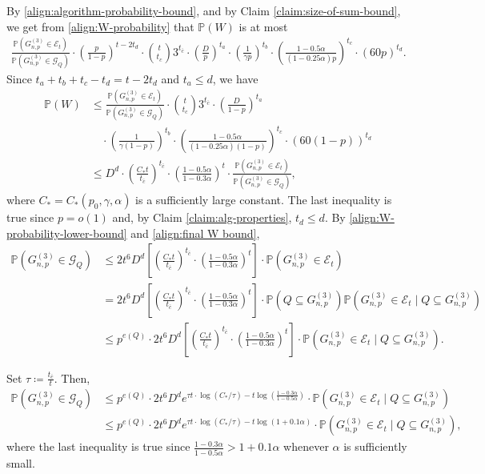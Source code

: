 \documentclass[11pt,a4paper,oneside,reqno]{amsart}
\newcommand{\Gnp}{G_{n, p}^{(3)}}
\newcommand{\cE}{\mathcal{E}}
\newcommand{\cG}{\mathcal{G}}
\renewcommand{\Pr}{\mathbb{P}}
\newcommand{\1}{\mathbbm{1}} %
\renewcommand{\le}{\leqslant}
\begin{document}
By \eqref{align:algorithm-probability-bound}, and by Claim \ref{claim:size-of-sum-bound}, we get from \eqref{align:W-probability} that $\Pr(W)$ is at most
\begin{align*}    
    \frac{\Pr\left(\Gnp \in \cE_t\right)}{\Pr\left(\Gnp \in \cG_Q\right)} \cdot \left(\frac{p}{1-p}\right)^{t - 2t_d} \cdot \binom{t}{t_c} 3^{t_{\bar{c}}} \cdot \left(\frac{D}{p}\right)^{t_a} \cdot \left(\frac{1}{\gamma p}\right)^{t_b} \cdot \left(\frac{1-0.5\alpha}{(1-0.25\alpha)p}\right)^{t_c} \cdot (60p)^{t_d}.
\end{align*}
Since $t_a + t_b + t_c - t_d = t - 2t_d$ and $t_a \le d$, we have
\begin{align}\label{align:final W bound}
    \nonumber\Pr(W) &\le \frac{\Pr\left(\Gnp \in \cE_t\right)}{\Pr\left(\Gnp \in \cG_Q\right)} \cdot \binom{t}{t_c} 3^{t_{\bar{c}}} \cdot \left(\frac{D}{1-p}\right)^{t_a} \\&\nonumber \quad \cdot \left(\frac{1}{\gamma (1-p)}\right)^{t_b} \cdot \left(\frac{1-0.5\alpha}{(1-0.25\alpha)(1-p)}\right)^{t_c} \cdot \left(60(1-p)\right)^{t_d}\\
    &\le D^{d} \cdot \left(\frac{C_{*}t}{t_{\bar{c}}}\right)^{t_{\bar{c}}} \cdot \left(\frac{1-0.5\alpha}{1-0.3\alpha}\right)^{t} \cdot \frac{\Pr\left(\Gnp \in \cE_t\right)}{\Pr\left(\Gnp \in \cG_Q\right)},
\end{align}
where $C_{*} = C_{*}(p_0, \gamma, \alpha)$ is a sufficiently large constant. The last inequality is true since $p=o(1)$ and, by Claim \ref{claim:alg-properties}, $t_d \le d$.
By \eqref{align:W-probability-lower-bound} and \eqref{align:final W bound},
\begin{align}
    \nonumber\Pr\left(\Gnp \in \cG_Q\right) &\le 2 t^{6} D^{d} \left[\left(\frac{C_{*}t}{t_{\bar{c}}}\right)^{t_{\bar{c}}} \cdot \left(\frac{1-0.5\alpha}{1-0.3\alpha}\right)^{t}\right] \cdot \Pr\left(\Gnp \in \cE_t\right) \\
    \nonumber&= 2 t^{6} D^{d} \left[\left(\frac{C_{*}t}{t_{\bar{c}}}\right)^{t_{\bar{c}}} \cdot \left(\frac{1-0.5\alpha}{1-0.3\alpha}\right)^{t}\right] \cdot \Pr\left(Q \subseteq \Gnp\right) \Pr\left(\Gnp \in \cE_t \mid Q \subseteq \Gnp\right) \\
    &\le p^{e(Q)} \cdot 2 t^{6} D^{d} \left[\left(\frac{C_{*}t}{t_{\bar{c}}}\right)^{t_{\bar{c}}} \cdot \left(\frac{1-0.5\alpha}{1-0.3\alpha}\right)^{t}\right] \cdot \Pr\left(\Gnp \in \cE_t \mid Q \subseteq \Gnp\right).
\end{align}

Set $\tau \coloneqq \frac{t_{\bar{c}}}{t}$. Then,
\begin{align}\label{align:T-cap-B_Q-upper-bound}
    \nonumber\Pr\left(\Gnp \in \cG_Q\right) &\le p^{e(Q)} \cdot 2 t^{6} D^{d} e^{\tau t \cdot \log(C_{*}/\tau) - t \log\left(\frac{1-0.3\alpha}{1-0.5\alpha}\right)} \cdot \Pr\left(\Gnp \in \cE_t \mid Q \subseteq \Gnp\right) \\
    &\le p^{e(Q)} \cdot 2 t^{6} D^{d} e^{\tau t \cdot \log(C_{*}/\tau) - t \log\left(1+0.1\alpha\right)} \cdot \Pr\left(\Gnp \in \cE_t \mid Q \subseteq \Gnp\right),
\end{align}
where the last inequality is true since $\frac{1-0.3\alpha}{1-0.5\alpha} > 1 + 0.1\alpha$ whenever $\alpha$ is sufficiently small.
\end{document}
